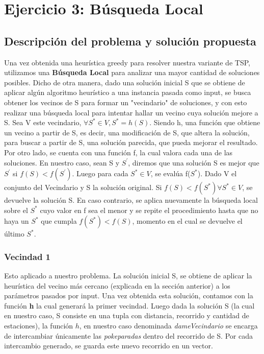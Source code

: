 \section{Ejercicio 3: Búsqueda Local}
    \subsection{Descripción del problema y solución propuesta}
    Una vez obtenida una heurística greedy para resolver nuestra variante de TSP, utilizamos una \textbf{Búsqueda Local} para analizar una mayor cantidad de soluciones posibles. Dicho de otra manera, dado una solución inicial S que se obtiene de aplicar algún algoritmo heurístico a una instancia pasada como input, se busca obtener los vecinos de S para formar un "vecindario" de soluciones, y con esto realizar una búsqueda local para intentar hallar un vecino cuya solución mejore a S. Sea V este vecindario, $\forall S^{*}\in V, S^{*} = h(S)$. Siendo h, una función que obtiene un vecino a partir de S, es decir, una modificación de S, que altera la solución, para buscar a partir de S, una solución parecida, que pueda mejorar el resultado. Por otro lado, se cuenta con una función f, la cual valora cada una de las soluciones. En nuestro caso, sean S y $S^{'}$, diremos que una solución S es mejor que $S^{'}$ si $f(S) < f(S^{'})$. Luego para cada $S^{*}\in V$, se evalúa f($S^{*}$). Dado V el conjunto del Vecindario y S la solución original. Si $f(S)<f(S^{*}) \forall S^{*}\in V$, se devuelve la solución S. En caso contrario, se aplica nuevamente la búsqueda local sobre el $S^{*}$ cuyo valor en f sea el menor y se repite el procedimiento hasta que no haya un $S^{*}$ que cumpla $f(S^{*})<f(S)$, momento en el cual se devuelve el último $S^{*}$.

    \subsubsection{Vecindad 1}

    \par Esto aplicado a nuestro problema. La solución inicial S, se obtiene de aplicar la heurística del vecino más cercano (explicada en la sección anterior) a los parámetros pasados por input. Una vez obtenida esta solución, contamos con la función \textbf{h} la cual generará la primer vecindad. Luego dada la solución S (la cual en nuestro caso, S consiste en una tupla con distancia, recorrido y cantidad de estaciones), la función $h$, en nuestro caso denominada \emph{dameVecindario} se encarga de intercambiar únicamente las \emph{pokeparadas} dentro del recorrido de S. Por cada intercambio generado, se guarda este nuevo recorrido en un vector.

